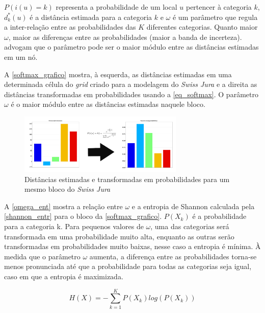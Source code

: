 $P(i(u)=k)$ representa a probabilidade de um local $u$ pertencer à categoria $k$, $d^*_k(u)$ é a distância estimada para a categoria $k$ e $\omega$ é um parâmetro que regula a inter-relação entre as probabilidades das $K$ diferentes categorias. Quanto maior $\omega$, maior as diferenças entre as probabilidades (maior a banda de incerteza).  advogam que o parâmetro pode ser o maior módulo entre as distâncias estimadas em um nó. 

A \autoref{softmax_grafico} mostra, à esquerda, as distâncias estimadas em uma determinada célula do \textit{grid} criado para a modelagem do \textit{Swiss Jura} e a direita as distâncias transformadas em probabilidades usando a \autoref{eq_softmax}. O parâmetro $\omega$ é o maior módulo entre as distâncias estimadas naquele bloco.

\begin{figure}[H]
	\caption{\label{softmax_grafico}Distâncias estimadas e transformadas em probabilidades para um mesmo bloco do \textit{Swiss Jura}}
	\centering
		\includegraphics[width=0.7\textwidth]{capitulo_2/imagens/dis_to_probs.png}
\end{figure}

A \autoref{omega_ent} mostra a relação entre $\omega$ e a entropia de Shannon \cite{shannon1948mathematical} calculada pela \autoref{shannon_entr} para o bloco da \autoref{softmax_grafico}. $P(X_k)$ é a probabilidade para a categoria k. Para pequenos valores de $\omega$, uma das categorias será transformada em uma probabilidade muito alta, enquanto as outras serão transformadas em probabilidades muito baixas, nesse caso a entropia é mínima. À medida que o parâmetro $\omega$ aumenta, a diferença entre as probabilidades torna-se menos pronunciada até que a probabilidade para todas as categorias seja igual, caso em que a entropia é maximizada.

\begin{equation}
	H(X)=-\sum_{k=1}^{K}P(X_{k})log(P(X_{k}))
    \label{shannon_entr}
\end{equation}

